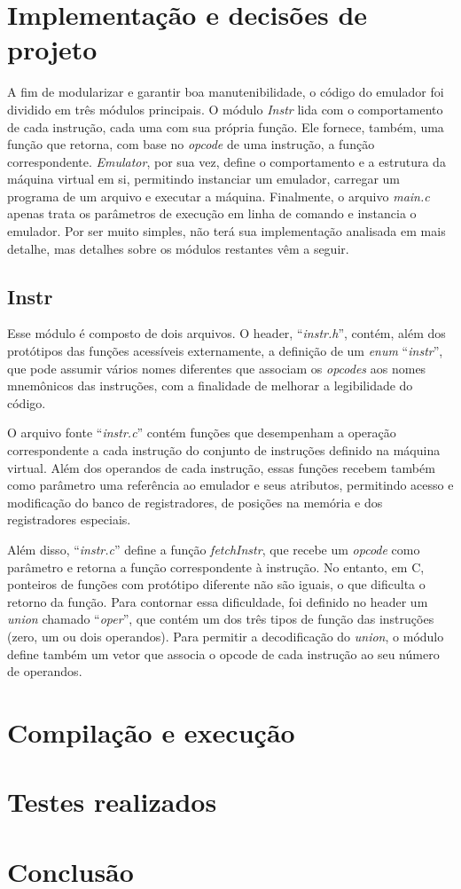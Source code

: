 \documentclass[10pt,a4paper]{article}
\numberwithin{equation}{section}
\begin{document}
\section{Implementação e decisões de projeto}

A fim de modularizar e garantir boa manutenibilidade, o código do emulador foi dividido em três módulos principais. O módulo \emph{Instr} lida com o comportamento de cada instrução, cada uma com sua própria função. Ele fornece, também, uma função que retorna, com base no \emph{opcode} de uma instrução, a função correspondente. \emph{Emulator}, por sua vez, define o comportamento e a estrutura da máquina virtual em si, permitindo instanciar um emulador, carregar um programa de um arquivo e executar a máquina. Finalmente, o arquivo \emph{main.c} apenas trata os parâmetros de execução em linha de comando e instancia o emulador. Por ser muito simples, não terá sua implementação analisada em mais detalhe, mas detalhes sobre os módulos restantes vêm a seguir.

\subsection{Instr}

Esse módulo é composto de dois arquivos. O header, ``\emph{instr.h}'', contém, além dos protótipos das funções acessíveis externamente, a definição de um \emph{enum} ``\emph{instr}'', que pode assumir vários nomes diferentes que associam os \emph{opcodes} aos nomes mnemônicos das instruções, com a finalidade de melhorar a legibilidade do código.

O arquivo fonte ``\emph{instr.c}'' contém funções que desempenham a operação correspondente a cada instrução do conjunto de instruções definido na máquina virtual. Além dos operandos de cada instrução, essas funções recebem também como parâmetro uma referência ao emulador e seus atributos, permitindo acesso e modificação do banco de registradores, de posições na memória e dos registradores especiais.

Além disso, ``\emph{instr.c}'' define a função \emph{fetchInstr}, que recebe um \emph{opcode} como parâmetro e retorna a função correspondente à instrução. No entanto, em C, ponteiros de funções com protótipo diferente não são iguais, o que dificulta o retorno da função. Para contornar essa dificuldade, foi definido no header um \emph{union} chamado ``\emph{oper}'', que contém um dos três tipos de função das instruções (zero, um ou dois operandos). Para permitir a decodificação do \emph{union}, o módulo define também um vetor que associa o opcode de cada instrução ao seu número de operandos.

\section{Compilação e execução}

\section{Testes realizados}

\section{Conclusão}
\end{document}
